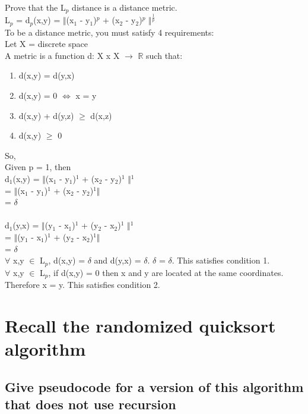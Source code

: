 \documentclass[10pt,letterpaper]{article}
\newcommand{\R}{\mathbb{R}}
\begin{document}
Prove that the L$_{p}$ distance is a distance metric.\\
L$_{p}$ = d$_{p}$(x,y) = $\Vert$(x$_{1}$ - y$_{1}$)$^{p}$ + (x$_{2}$ - y$_{2}$)$^{p}$ $\Vert$$^{\frac{1}{p}}$ \\
To be a distance metric, you must satisfy 4 requirements:\\
Let X = discrete space\\
A metric is a function d: X x X $\rightarrow$ $\R$ such that:
\begin{enumerate}
  \item d(x,y) = d(y,x)
  \item d(x,y) = 0 $\Leftrightarrow$ x = y
  \item d(x,y) + d(y,z) $\geq$ d(x,z)
  \item d(x,y) $\geq$ 0
\end{enumerate}
So,\\
Given p = 1, then\\
d$_{1}$(x,y) = $\Vert$(x$_{1}$ - y$_{1}$)$^{1}$ + (x$_{2}$ - y$_{2}$)$^{1}$ $\Vert$$^{1}$ \\
= $\Vert$(x$_{1}$ - y$_{1}$)$^{1}$ + (x$_{2}$ - y$_{2}$)$^{1}$$\Vert$\\
= $\delta$\\
\\
d$_{1}$(y,x) = $\Vert$(y$_{1}$ - x$_{1}$)$^{1}$ + (y$_{2}$ - x$_{2}$)$^{1}$ $\Vert$$^{1}$ \\
= $\Vert$(y$_{1}$ - x$_{1}$)$^{1}$ + (y$_{2}$ - x$_{2}$)$^{1}$$\Vert$\\
= $\delta$\\
$\forall$ x,y $\in$ L$_{p}$, d(x,y) = $\delta$ and d(y,x) = $\delta$. $\delta$ = $\delta$. This satisfies condition 1.\\

$\forall$ x,y $\in$ L$_{p}$, if  d(x,y) = 0 then x and y are located at the same coordinates. Therefore x = y. This satisfies condition 2.


\section{Recall the randomized
quicksort algorithm}

\subsection{Give pseudocode for a version of this algorithm
that does not use recursion}
\end{document}
